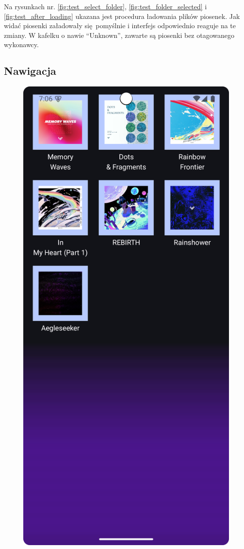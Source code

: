 Na rysunkach nr. \ref{fig:test_select_folder}, \ref{fig:test_folder_selected} i \ref{fig:test_after_loading} ukazana jest procedura ładowania plików piosenek. Jak widać piosenki załadowały się pomyślnie i interfejs odpowiednio reaguje na te zmiany. W kafelku o nawie \enquote{Unknown}, zawarte są piosenki bez otagowanego wykonawcy.

\subsection{Nawigacja}

\begin{figure}[H]
	\centering
	\includegraphics[width=1\textwidth]{images/tutorial_album_view.png}

\end{figure}
